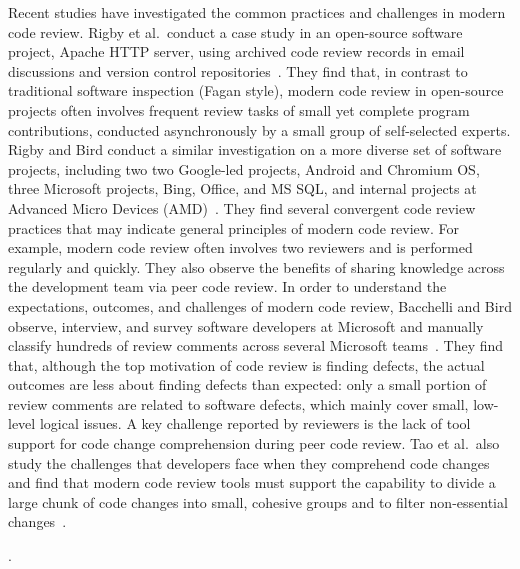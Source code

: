 \documentclass[runningheads,a4paper]{llncs}
\begin{document}
Recent studies have investigated the common practices and challenges in modern code review. Rigby et al.~conduct a case study in an open-source software project, Apache HTTP server, using archived code review records in email discussions and version control repositories~\cite{rigby2008open}. They find that, in contrast to traditional software inspection (Fagan style), modern code review in open-source projects often involves frequent review tasks of small yet complete program contributions, conducted asynchronously by a small group of self-selected experts. Rigby and Bird conduct a similar investigation on a more diverse set of software projects, including two two Google-led projects, Android and Chromium OS, three Microsoft projects, Bing, Office, and MS SQL, and internal projects at Advanced Micro Devices (AMD)~\cite{rigby2013convergent}. They find several convergent code review practices that may indicate general principles of modern code review. For example, modern code review often involves two reviewers and is performed regularly and quickly. They also observe the benefits of sharing knowledge across the development team via peer code review. In order to understand the expectations, outcomes, and challenges of modern code review, Bacchelli and Bird observe, interview, and survey software developers at Microsoft and manually classify hundreds of review comments across several Microsoft teams~\cite{bacchelli2013expectations}. They find that, although the top motivation of code review is finding defects, the actual outcomes are less about finding defects than expected: only a small portion of review comments are related to software defects, which mainly cover small, low-level logical issues. A key challenge reported by reviewers is the lack of tool support for code change comprehension during peer code review. Tao et al.~also study the challenges that developers face when they comprehend code changes and find that modern code review tools must support the capability to divide a large chunk of code changes into small, cohesive groups and to filter non-essential changes~\cite{tao2012software}. 

. 
\end{document}
